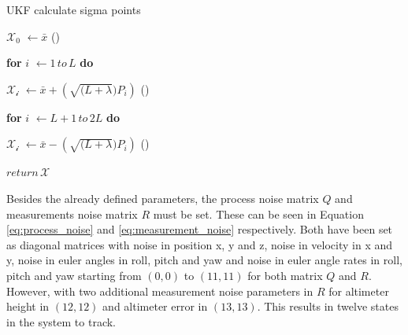 \documentclass[../Head/report.tex]{subfiles}
\begin{document}
\begin{Pseudo}{UKF calculate sigma points}{}
\begin{Indentation}
	\item $\mathcal{X_0}$  \(\leftarrow \bar{x}\) \qquad {}(\theequation)\label{eq:update_zero_sigma_point}
	\item \textbf{for} $i$ \(\leftarrow 1\, to\, L\) \textbf{do}
        \begin{Indentation}
            \item $\mathcal{X_i}$ \(\leftarrow \bar{x} + \left(\sqrt{(L+\lambda})P_i\right)\) \qquad {}(\theequation)\label{eq:update_ith_sigma_point_plus}
         \end{Indentation}
            
    \item \textbf{for} $i$ \(\leftarrow L+1\, to\, 2L\) \textbf{do}
        \begin{Indentation}
            \item $\mathcal{X_i}$ \(\leftarrow \bar{x} - \left(\sqrt{(L+\lambda})P_i\right)\) \qquad {}(\theequation)\label{eq:update_ith_sigma_point_minus}
    	\end{Indentation}
    	\item $return\, \mathcal{X}$
\end{Indentation}
\end{Pseudo}


Besides the already defined parameters, the process noise matrix $Q$ and measurements noise matrix $R$ must be set. These can be seen in Equation \ref{eq:process_noise} and \ref{eq:measurement_noise} respectively. Both have been set as diagonal matrices with noise in position x, y and z, noise in velocity in x and y, noise in euler angles in roll, pitch and yaw and noise in euler angle rates in roll, pitch and yaw starting from $(0,0)$ to $(11,11)$ for both matrix $Q$ and $R$. However, with two additional measurement noise parameters in $R$ for altimeter height in $(12,12)$ and altimeter error in $(13,13)$. This results in twelve states in the system to track.
\end{document}
